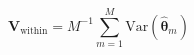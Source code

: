 \begin{equation}
    \label{eq:mi-var-within}
    \mathbf{V}_{\mathrm{within}}
    =
    M^{-1}
    \sum_{m = 1}^{M}
    \mathrm{Var}
    \left(
    \hat{\boldsymbol{\theta}}_{m}
    \right)
\end{equation}

